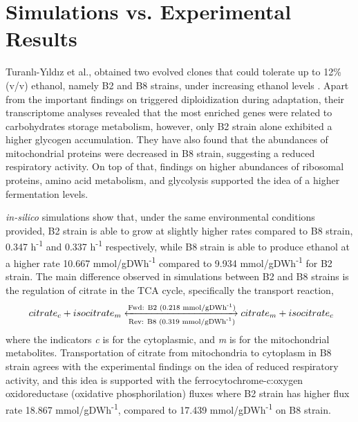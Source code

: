 \section{Simulations vs. Experimental Results}
Turanlı-Yıldız et al., obtained two evolved clones that could tolerate up to 12\% (v/v) ethanol, namely B2 and B8 strains, under increasing ethanol levels \cite{TuranlYldz2017}. Apart from the important findings on triggered diploidization during adaptation, their transcriptome analyses revealed that the most enriched genes were related to carbohydrates storage metabolism, however, only B2 strain alone exhibited a higher glycogen accumulation. They have also found that the abundances of mitochondrial proteins were decreased in B8 strain, suggesting a reduced respiratory activity. On top of that, findings on higher abundances of ribosomal proteins, amino acid metabolism, and glycolysis supported the idea of a higher fermentation levels.

\emph{in-silico} simulations show that, under the same environmental conditions provided, B2 strain is able to grow at slightly higher rates compared to B8 strain, 0.347 h\textsuperscript{-1} and 0.337 h\textsuperscript{-1} respectively, while B8 strain is able to produce ethanol at a higher rate 10.667 mmol/gDWh\textsuperscript{-1} compared to 9.934 mmol/gDWh\textsuperscript{-1} for B2 strain. The main difference observed in simulations between B2 and B8 strains is the regulation of citrate in the TCA cycle, specifically the transport reaction,
\begin{align}
\label{eq:citratetransport}
\ citrate_c + isocitrate_m \xleftrightarrow[\text{Rev: B8 (0.319 mmol/gDWh\textsuperscript{-1})}]{\text{Fwd: B2 (0.218 mmol/gDWh\textsuperscript{-1})}} citrate_m + isocitrate_c
\end{align}
\noindent where the indicators \emph{c} is for the cytoplasmic, and \emph{m} is for the mitochondrial metabolites. Transportation of citrate from mitochondria to cytoplasm in B8 strain agrees with the experimental findings on the idea of reduced respiratory activity, and this idea is supported with the ferrocytochrome-c:oxygen oxidoreductase (oxidative phosphorilation) fluxes where B2 strain has higher flux rate 18.867 mmol/gDWh\textsuperscript{-1}, compared to 17.439 mmol/gDWh\textsuperscript{-1} on B8 strain.

